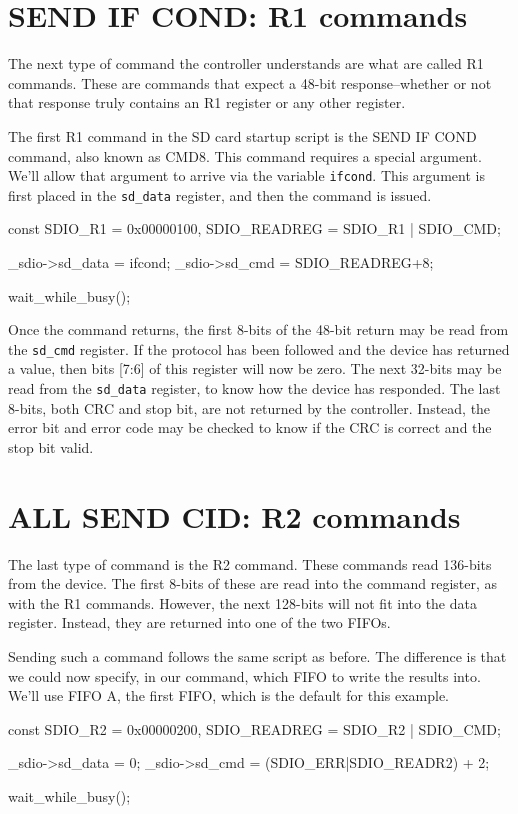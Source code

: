 \documentclass{gqtekspec}
\begin{document}
\section{SEND IF COND: R1 commands}
The next type of command the controller understands are what are called
R1 commands.  These are commands that expect a 48-bit response--whether
or not that response truly contains an R1 register or any other register.

The first R1 command in the SD card startup script is the SEND IF COND command,
also known as CMD8.  This command requires a special argument.  We'll allow
that argument to arrive via the variable {\tt ifcond}.  This argument is first
placed in the {\tt sd\_data} register, and then the command is issued.

\begin{zCpp}
	const	SDIO_R1      = 0x00000100,
		SDIO_READREG = SDIO_R1 | SDIO_CMD;

	_sdio->sd_data = ifcond;
	_sdio->sd_cmd = SDIO_READREG+8;

	wait_while_busy();
\end{zCpp}

Once the command returns, the first 8-bits of the 48-bit return may be
read from the {\tt sd\_cmd} register.  If the protocol has been followed and
the device has returned a value, then bits [7:6] of this register will now
be zero.  The next 32-bits may be read from the {\tt sd\_data} register, to
know how the device has responded.  The last 8-bits, both CRC and stop bit,
are not returned by the controller.  Instead, the error bit and error code may
be checked to know if the CRC is correct and the stop bit valid.

\section{ALL SEND CID: R2 commands}
The last type of command is the R2 command.  These commands read 136-bits
from the device.  The first 8-bits of these are read into the command register,
as with the R1 commands.  However, the next 128-bits will not fit into the
data register.  Instead, they are returned into one of the two FIFOs.

Sending such a command follows the same script as before.  The difference is
that we could now specify, in our command, which FIFO to write the results into.
We'll use FIFO A, the first FIFO, which is the default for this example.

\begin{zCpp}
	const	SDIO_R2      = 0x00000200,
		SDIO_READREG = SDIO_R2 | SDIO_CMD;

	_sdio->sd_data = 0;
	_sdio->sd_cmd = (SDIO_ERR|SDIO_READR2) + 2;

	wait_while_busy();
\end{zCpp}
\end{document}
